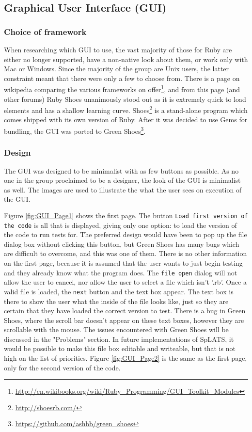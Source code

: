   \subsection{Graphical User Interface (GUI)}
  \subsubsection{Choice of framework}
  When researching which GUI to use, the vast majority of those for Ruby are either no longer supported, have a non-native look about them, or work only with Mac or Windows. Since the majority of the group are Unix users, the latter constraint meant that there were only a few to choose from. There is a page on wikipedia comparing the various frameworks on offer\footnote{\url{http://en.wikibooks.org/wiki/Ruby_Programming/GUI_Toolkit_Modules}}, and from this page (and other forums) Ruby Shoes unanimously stood out as it is extremely quick to load elements and has a shallow learning curve.
  Shoes\footnote{\url{http://shoesrb.com/}} is a stand-alone program which comes shipped with its own version of Ruby. After it was decided to use Gems for bundling, the GUI was ported to Green Shoes\footnote{\url{https://github.com/ashbb/green_shoes}}.
  
  \subsubsection{Design}
  The GUI was designed to be minimalist with as few buttons as possible. As no one in the group proclaimed to be a designer, the look of the GUI is minimalist as well. The images are used to illustrate the what the user sees on execution of the GUI.
  
  Figure \ref{fig:GUI_Page1} shows the first page. The button \verb+Load first version of the code+ is all that is displayed, giving only one option: to load the version of the code to run tests for. The preferred design would have been to pop up the file dialog box without clicking this button, but Green Shoes has many bugs which are difficult to overcome, and this was one of them. There is no other information on the first page, because it is assumed that the user wants to just begin testing and they already know what the program does. The \verb+file open+ dialog will not allow the user to cancel, nor allow the user to select a file which isn't '.rb'. Once a valid file is loaded, the \verb+next+ button and the text box appear. The text box is there to show the user what the inside of the file looks like, just so they are certain that they have loaded the correct version to test. There is a bug in Green Shoes, where the scroll bar doesn't appear on these text boxes, however they are scrollable with the mouse. The issues encountered with Green Shoes will be discussed in the "Problems" section. In future implementations of SpLATS, it would be possible to make this file box editable and writeable, but that is not high on the list of priorities.
Figure \ref{fig:GUI_Page2} is the same as the first page, only for the second version of the code.
  
